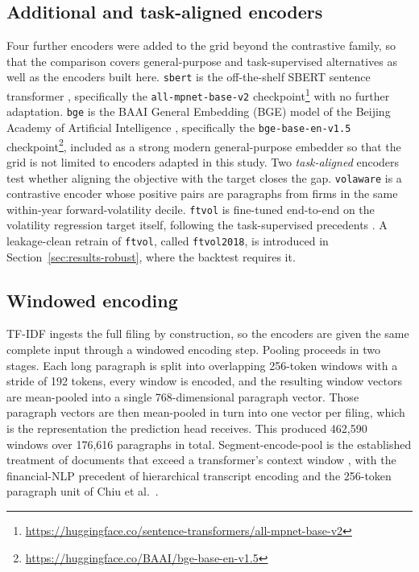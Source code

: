\documentclass[logo,msc,ai]{infthesis}        %
\begin{document}
\subsection{Additional and task-aligned encoders}
Four further encoders were added to the grid beyond the contrastive family, so that the comparison covers general-purpose and task-supervised alternatives as well as the encoders built here. \texttt{sbert} is the off-the-shelf SBERT sentence transformer \cite{reimers2019sentence}, specifically the \texttt{all-mpnet-base-v2} checkpoint\footnote{\url{https://huggingface.co/sentence-transformers/all-mpnet-base-v2}} with no further adaptation. \texttt{bge} is the BAAI General Embedding (BGE) model of the Beijing Academy of Artificial Intelligence \cite{xiao2023cpack}, specifically the \texttt{bge-base-en-v1.5} checkpoint\footnote{\url{https://huggingface.co/BAAI/bge-base-en-v1.5}}, included as a strong modern general-purpose embedder so that the grid is not limited to encoders adapted in this study. Two \emph{task-aligned} encoders test whether aligning the objective with the target closes the gap. \texttt{volaware} is a contrastive encoder whose positive pairs are paragraphs from firms in the same within-year forward-volatility decile. \texttt{ftvol} is fine-tuned end-to-end on the volatility regression target itself, following the task-supervised precedents \cite{qin2019you,yang2020html}. A leakage-clean retrain of \texttt{ftvol}, called \texttt{ftvol2018}, is introduced in Section~\ref{sec:results-robust}, where the backtest requires it.

\subsection{Windowed encoding}
\label{sec:windowed}
TF-IDF ingests the full filing by construction, so the encoders are given the same complete input through a windowed encoding step. Pooling proceeds in two stages. Each long paragraph is split into overlapping 256-token windows with a stride of 192 tokens, every window is encoded, and the resulting window vectors are mean-pooled into a single 768-dimensional paragraph vector. Those paragraph vectors are then mean-pooled in turn into one vector per filing, which is the representation the prediction head receives. This produced 462{,}590 windows over 176{,}616 paragraphs in total. Segment-encode-pool is the established treatment of documents that exceed a transformer's context window \cite{beltagy2020longformer}, with the financial-NLP precedent of hierarchical transcript encoding \cite{yang2020html} and the 256-token paragraph unit of Chiu et al.\ \cite{chiu2025financial}.
\end{document}
